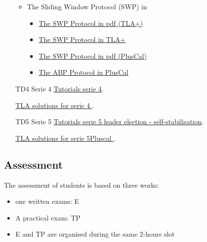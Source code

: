 \documentclass[ 12pt]{article}
\begin{document}
\begin{enumerate}
\begin{itemize}
          \item  The Sliding Window  Protocol  (SWP) in 
         \begin{itemize}
         \item 
           \href{http://mery54.github.io/teaching/aspd/models/a_slidingwindow.pdf}{The 
             SWP Protocol in pdf (TLA+)  }
   \item 
           \href{http://mery54.github.io/teaching/aspd/models/a_slidingwindow.tla}{The 
             SWP  Protocol in TLA+}
                    \item 
           \href{http://mery54.github.io/teaching/aspd/models/a_pluscal_slidingwindow.pdf}{The 
             SWP Protocol in pdf (PlusCal)}
   \item 
           \href{http://mery54.github.io/teaching/aspd/models/a_pluscal_slidingwindow.tla}{The 
           ABP Protocol in PlusCal}          
       \end{itemize}

         \end{itemize}
         
\item[TD4]   Serie  4
    \href{http://mery54.github.io/teaching/aspd/lecturesnotes/aspd-il26-td4.pdf}{Tutorials 
      serie 4}.

        \href{http://mery54.github.io/teaching/aspd/models/tlatd4.zip}{TLA 
           solutions for serie 4
         }.

\item[TD5]   Serie 5 
    \href{http://mery54.github.io/teaching/aspd/lecturesnotes/aspd-il-td5.pdf}{Tutorials
      serie 5   leader election - self-stabilisation}.

        \href{http://mery54.github.io/teaching/aspd/models/tlatd5.zip}{TLA 
           solutions for serie 5Pluscal
         }.
                  
         \end{enumerate}

  


  
  \subsection{Assessment}
\label{sec:project}

The assessment  of students is based on three works:
\begin{itemize}
\item one  written  exams: E
\item  A practical exam: TP
\item  E and TP are organised  during the same   2-hours  slot 
 \end{itemize}
\end{document}

